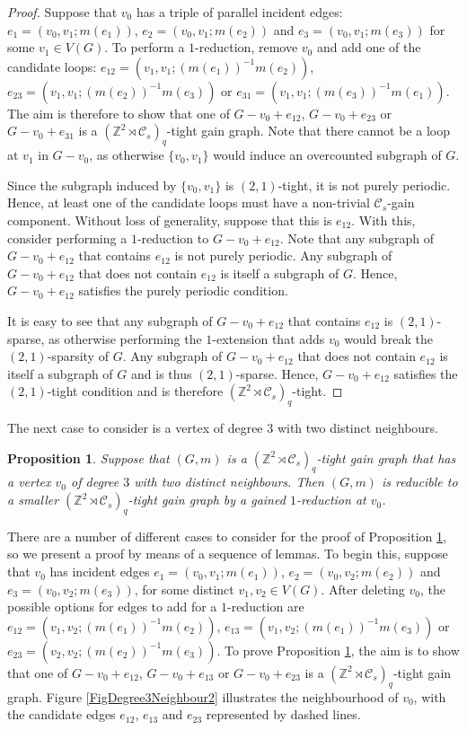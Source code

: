 \documentclass[reqno,a4paper,10pt]{article}
\newtheorem{proposition}[theorem]{Proposition}
\theoremstyle{definition}
\theoremstyle{remark}
\numberwithin{equation}{section}
\numberwithin{figure}{section}
\numberwithin{table}{section}
\newcommand{\Z}{\mathbb{Z}}
\begin{document}
    \begin{proof}
        Suppose that $v_0$ has a triple of parallel incident edges: $e_1=(v_0,v_1;m(e_1))$, $e_2=(v_0,v_1;m(e_2))$ and $e_3=(v_0,v_1;m(e_3))$ for some $v_1\in V(G)$. To perform a $1$-reduction, remove $v_0$ and add one of the candidate loops: $e_{12}=(v_1,v_1;(m(e_1))^{-1}m(e_2))$, $e_{23}=(v_1,v_1;(m(e_2))^{-1}m(e_3))$ or $e_{31}=(v_1,v_1;(m(e_3))^{-1}m(e_1))$. The aim is therefore to show that one of $G-v_0+e_{12}$, $G-v_0+e_{23}$ or $G-v_0+e_{31}$ is a $(\Z^2\rtimes\mathcal{C}_s)_q$-tight gain graph. Note that there cannot be a loop at $v_1$ in $G-v_0$, as otherwise $\{v_0,v_1\}$ would induce an overcounted subgraph of $G$.

        Since the subgraph induced by $\{v_0,v_1\}$ is $(2,1)$-tight, it is not purely periodic. Hence, at least one of the candidate loops must have a non-trivial $\mathcal{C}_s$-gain component. Without loss of generality, suppose that this is $e_{12}$. With this, consider performing a $1$-reduction to $G-v_0+e_{12}$. Note that any subgraph of $G-v_0+e_{12}$ that contains $e_{12}$ is not purely periodic. Any subgraph of $G-v_0+e_{12}$ that does not contain $e_{12}$ is itself a subgraph of $G$. Hence, $G-v_0+e_{12}$ satisfies the purely periodic condition.

        It is easy to see that any subgraph of $G-v_0+e_{12}$ that contains $e_{12}$ is $(2,1)$-sparse, as otherwise performing the $1$-extension that adds $v_0$ would break the $(2,1)$-sparsity of $G$. Any subgraph of $G-v_0+e_{12}$ that does not contain $e_{12}$ is itself a subgraph of $G$ and is thus $(2,1)$-sparse. Hence, $G-v_0+e_{12}$ satisfies the $(2,1)$-tight condition and is therefore $(\Z^2\rtimes\mathcal{C}_s)_q$-tight.
    \end{proof}
    The next case to consider is a vertex of degree $3$ with two distinct neighbours.
    \begin{proposition}\label{LqZCsDegree3Neighbour2}
		Suppose that $(G,m)$ is a $(\Z^2\rtimes\mathcal{C}_s)_q$-tight gain graph that has a vertex $v_0$ of degree $3$ with two distinct neighbours. Then $(G,m)$ is reducible to a smaller $(\Z^2\rtimes\mathcal{C}_s)_q$-tight gain graph by a gained $1$-reduction at $v_0$.
	\end{proposition}
  There are a number of different cases to consider for the proof of Proposition \ref{LqZCsDegree3Neighbour2}, so we present a proof by means of a sequence of lemmas. To begin this, suppose that $v_0$ has incident edges $e_1=(v_0,v_1;m(e_1))$, $e_2=(v_0,v_2;m(e_2))$ and $e_3=(v_0,v_2;m(e_3))$, for some distinct $v_1,v_2\in V(G)$. After deleting $v_0$, the possible options for edges to add for a $1$-reduction are $e_{12}=(v_1,v_2;(m(e_1))^{-1}m(e_2))$, $e_{13}=(v_1,v_2;(m(e_1))^{-1}m(e_3))$ or $e_{23}=(v_2,v_2;(m(e_2))^{-1}m(e_3))$. To prove Proposition \ref{LqZCsDegree3Neighbour2}, the aim is to show that one of $G-v_0+e_{12}$, $G-v_0+e_{13}$ or $G-v_0+e_{23}$ is a $(\Z^2\rtimes\mathcal{C}_s)_q$-tight gain graph. Figure \ref{FigDegree3Neighbour2} illustrates the neighbourhood of $v_0$, with the candidate edges $e_{12}$, $e_{13}$ and $e_{23}$ represented by dashed lines.
\end{document}

